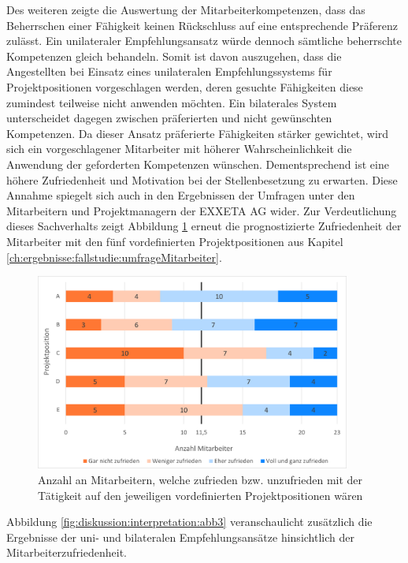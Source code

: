 Des weiteren zeigte die Auswertung der Mitarbeiterkompetenzen, dass das Beherrschen einer Fähigkeit keinen Rückschluss auf eine entsprechende Präferenz zulässt. Ein unilateraler Empfehlungsansatz würde dennoch sämtliche beherrschte Kompetenzen gleich behandeln. Somit ist davon auszugehen, dass die Angestellten bei Einsatz eines unilateralen Empfehlungssystems für Projektpositionen vorgeschlagen werden, deren gesuchte Fähigkeiten diese zumindest teilweise nicht anwenden möchten. Ein bilaterales System unterscheidet dagegen zwischen präferierten und nicht gewünschten Kompetenzen. Da dieser Ansatz präferierte Fähigkeiten stärker gewichtet, wird sich ein vorgeschlagener Mitarbeiter mit höherer Wahrscheinlichkeit die Anwendung der geforderten Kompetenzen wünschen. Dementsprechend ist eine höhere Zufriedenheit und Motivation bei der Stellenbesetzung zu erwarten. Diese Annahme spiegelt sich auch in den Ergebnissen der Umfragen unter den Mitarbeitern und Projektmanagern der EXXETA AG wider. Zur Verdeutlichung dieses Sachverhalts zeigt Abbildung \ref{fig:diskussion:interpretation:abb1} erneut die prognostizierte Zufriedenheit der Mitarbeiter mit den fünf vordefinierten Projektpositionen aus Kapitel \ref{ch:ergebnisse:fallstudie:umfrageMitarbeiter}.

\begin{figure}[h]
	\centering
	\includegraphics[width=0.925\textwidth]{gfx/mitarbeiter-zufriedenheit-umfrage.png}
	\caption{Anzahl an Mitarbeitern, welche zufrieden bzw. unzufrieden mit der Tätigkeit auf den jeweiligen vordefinierten Projektpositionen wären}
	\label{fig:diskussion:interpretation:abb1}
\end{figure}

Abbildung \ref{fig:diskussion:interpretation:abb3} veranschaulicht zusätzlich die Ergebnisse der uni- und bilateralen Empfehlungsansätze hinsichtlich der Mitarbeiterzufriedenheit. 

